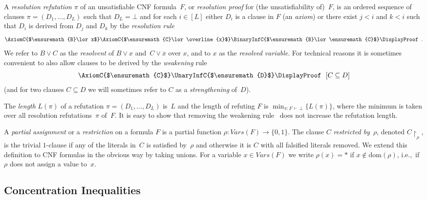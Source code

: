 \documentclass{theoretics}
\newcommand{\set}[1]{\{ #1 \}}
\newcommand{\olnot}[1]{\overline{#1}}
\newcommand{\introduceterm}[1]{{\emph{#1}}}
\newcommand{\eqperiod}{\enspace .}
\newcommand{\ie}{i.e.,\ }
\newcommand{\proofstd}{\pi}
\newcommand{\derives}{\vdash}
\newcommand{\derivof}[4][\derives]
        {{\ensuremath{{#2} : {#3} \, {#1}\, {#4}}}}
\newcommand{\refof}[2]{\derivof{#1}{#2}{\bot}}
\newcommand{\emptycl}{\bot}
\newcommand{\formf}{\ensuremath{F}}
\newcommand{\clb}{\ensuremath{B}}
\newcommand{\clc}{\ensuremath{C}}
\newcommand{\cld}{\ensuremath{D}}
\newcommand{\setsofvarsorlit}[2]{\mathit{#1}({#2})}
\newcommand{\vars}[1]{\setsofvarsorlit{Vars}{#1}}
\newcommand{\restrict}[2]{{{#1}\!\!\upharpoonright_{#2}}}
\newcommand{\genericformsmall}[2]{\mathit{#1}( #2 )}
\newcommand{\length}[1]{\genericformsmall{L}{#1}}
\newcommand{\dom}[1]{\mathrm{dom} ( #1 )}
\newcommand{\lengthsize}{length\xspace}
\numberwithin{equation}{section}
\begin{document}
A \introduceterm{resolution  refutation} $\proofstd$ of an unsatisfiable CNF formula~$\formf$,
or
\introduceterm{resolution proof} for (the unsatisfiability
of)~$\formf$, 
is an ordered sequence of clauses
\mbox{$\proofstd = (\cld_1, \dotsc, \cld_{L})$}
such that $\cld_{L} = \emptycl$ and
for each $i \in [L]$
either 
$\cld_i$ is a clause in $\formf$
(an \introduceterm{axiom})
or there exist $j < i$ and $k < i$ such that
$\cld_i$ is derived from $\cld_j$ and $\cld_k$
by the
\introduceterm{resolution rule}
\begin{equation}
\label{eq:resolution-rule}
\AxiomC{$\clb \lor x$}
\AxiomC{$\clc \lor \olnot{x}$}
\BinaryInfC{$\clb \lor \clc$}
\DisplayProof
\eqperiod
\end{equation}
We refer to $\clb \lor \clc$ as the \introduceterm{resolvent} of $\clb
\lor x$ and~$\clc \lor \olnot{x}$ over $x$, and to $x$ as the
\emph{resolved variable}. 
For technical reasons it is 
sometimes convenient to also allow
clauses to be derived 
by the \introduceterm{weakening} rule
\begin{equation}
\label{eq:weakening}
\AxiomC{$\clc$}
\UnaryInfC{$\cld$}
\DisplayProof
\ \ [ \clc \subseteq \cld ]
\end{equation}
(and for two clauses 
$\clc \subseteq \cld$
we will sometimes refer to $\clc$
as a \introduceterm{strengthening} of~$\cld$).

The \introduceterm{\lengthsize}
$\length{\proofstd}$   
of a refutation $\proofstd = (\cld_1, \dotsc, \cld_{L})$
is~$L$ and the length of refuting 
$\formf$ is
$\min_{\refof{\proofstd}{\formf}}\set{\length{\proofstd}}$, 
where the minimum is taken over all resolution refutations~$\proofstd$
of~$\formf$.
It is easy to show that
removing the weakening rule~
does not increase the refutation length.

A \introduceterm{partial assignment} or a \introduceterm{restriction} on a 
formula $\formf$ is a partial function $\rho : \vars{F} \rightarrow \set{0,1}$. 
The clause $C$
\introduceterm{restricted by~$\rho$}, denoted $\restrict{C}{\rho}$, is
the trivial $1$-clause if any of the literals in~$C$ is satisfied by~$\rho$
and otherwise it is $C$ with all falsified literals removed. We extend
this definition  
to CNF formulas in the obvious way by taking unions.
For a variable $x\in \vars{F}$ we 
write
$\rho(x)=*$ if $x\notin \dom{\rho}$,
\ie if $\rho$ does not assign a value to~$x$.

\subsection{Concentration Inequalities}
\end{document}

